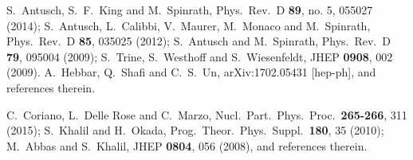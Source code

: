 \documentclass[12pt]{article}
\begin{document}
\begin{thebibliography}{99}
  S.~Antusch, S.~F.~King and M.~Spinrath,
  Phys.\ Rev.\ D {\bf 89}, no. 5, 055027 (2014);
  S.~Antusch, L.~Calibbi, V.~Maurer, M.~Monaco and M.~Spinrath,
  Phys.\ Rev.\ D {\bf 85}, 035025 (2012);
  S.~Antusch and M.~Spinrath,
  Phys.\ Rev.\ D {\bf 79}, 095004 (2009);
  S.~Trine, S.~Westhoff and S.~Wiesenfeldt,
  JHEP {\bf 0908}, 002 (2009).
  A.~Hebbar, Q.~Shafi and C.~S.~Un,
  arXiv:1702.05431 [hep-ph], and references therein.


  C.~Coriano, L.~Delle Rose and C.~Marzo,
  Nucl.\ Part.\ Phys.\ Proc.\  {\bf 265-266}, 311 (2015);
  S.~Khalil and H.~Okada,
  Prog.\ Theor.\ Phys.\ Suppl.\  {\bf 180}, 35 (2010);
  M.~Abbas and S.~Khalil,
  JHEP {\bf 0804}, 056 (2008), and references therein.


\end{thebibliography}
\end{document}
